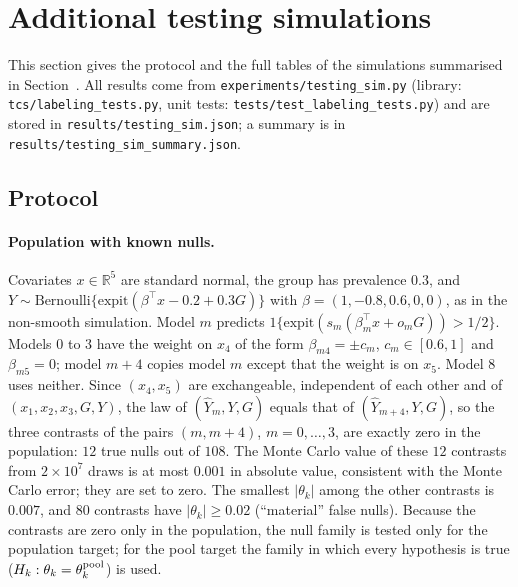 \section{Additional testing simulations}\label{si:testing-sim}

This section gives the protocol and the full tables of the simulations summarised in Section~. All results come from \texttt{experiments/testing\_sim.py} (library: \texttt{tcs/labeling\_tests.py}, unit tests: \texttt{tests/test\_labeling\_tests.py}) and are stored in \texttt{results/testing\_sim.json}; a summary is in \texttt{results/testing\_sim\_summary.json}.

\subsection{Protocol}

\paragraph{Population with known nulls.} Covariates $x\in\mathbb R^5$ are standard normal, the group has prevalence $0.3$, and $Y\sim\mathrm{Bernoulli}\{\mathrm{expit}(\beta^\top x-0.2+0.3G)\}$ with $\beta=(1,-0.8,0.6,0,0)$, as in the non-smooth simulation. Model $m$ predicts $1\{\mathrm{expit}(s_m(\beta_m^\top x+o_mG))>1/2\}$. Models $0$ to $3$ have the weight on $x_4$ of the form $\beta_{m4}=\pm c_m$, $c_m\in[0.6,1]$ and $\beta_{m5}=0$; model $m+4$ copies model $m$ except that the weight is on $x_5$. Model $8$ uses neither. Since $(x_4,x_5)$ are exchangeable, independent of each other and of $(x_1,x_2,x_3,G,Y)$, the law of $(\hat Y_m,Y,G)$ equals that of $(\hat Y_{m+4},Y,G)$, so the three contrasts of the pairs $(m,m+4)$, $m=0,\dots,3$, are exactly zero in the population: $12$ true nulls out of $108$. The Monte Carlo value of these $12$ contrasts from $2\times10^7$ draws is at most $0.001$ in absolute value, consistent with the Monte Carlo error; they are set to zero. The smallest $|\theta_k|$ among the other contrasts is $0.007$, and $80$ contrasts have $|\theta_k|\ge0.02$ (``material'' false nulls). Because the contrasts are zero only in the population, the null family is tested only for the population target; for the pool target the family in which every hypothesis is true ($H_k:\theta_k=\theta_k^{\rm pool}$) is used.

